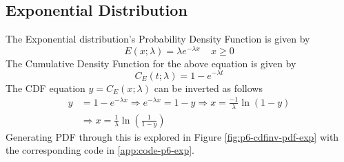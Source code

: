 \documentclass[main.tex]{article}
\begin{document}
    \subsection{Exponential Distribution}
    The Exponential distribution's Probability Density Function is given by
    \begin{equation}
        E(x; \lambda) = \lambda e^{-\lambda x} \;\;\;\; x \ge 0
    \end{equation}
    The Cumulative Density Function for the above equation is given by
    \begin{equation}
        C_E(t; \lambda) = 1 - e^{-\lambda t}
    \end{equation}
    The CDF equation $y = C_E(x;\lambda)$ can be inverted as follows
    \begin{equation}
        \begin{split}
            y & = 1 - e^{-\lambda x} \Rightarrow e^{-\lambda x} = 1 - y 
            \Rightarrow x = \frac{-1}{\lambda} \ln (1-y) \\
            & \Rightarrow x = \frac{1}{\lambda} \ln \left ( \frac{1}{1-y} \right )
        \end{split}
    \end{equation}
    Generating PDF through this is explored in Figure \ref{fig:p6-cdfinv-pdf-exp} with the corresponding code in \ref{app:code-p6-exp}.
\end{document}
